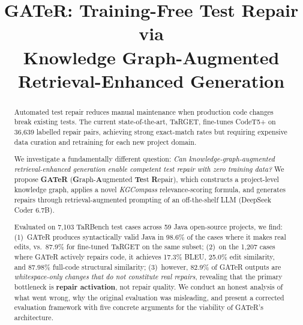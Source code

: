 \documentclass[conference,10pt]{IEEEtran}
\begin{document}
\title{GATeR: Training-Free Test Repair via\\Knowledge Graph-Augmented Retrieval-Enhanced Generation}

\author{
}

\maketitle

\begin{abstract}
Automated test repair reduces manual maintenance when production code
changes break existing tests.  The current state-of-the-art,
TaRGET, fine-tunes CodeT5+ on 36{,}639 labelled repair pairs,
achieving strong exact-match rates but requiring expensive data
curation and retraining for each new project domain.

We investigate a fundamentally different question: \emph{Can
knowledge-graph-augmented retrieval-enhanced generation enable competent
test repair with zero training data?}
We propose \textbf{GATeR}
(\textbf{G}raph-\textbf{A}ugmented \textbf{Te}st \textbf{R}epair),
which constructs a project-level knowledge graph, applies a novel
\emph{KGCompass} relevance-scoring formula, and generates repairs
through retrieval-augmented prompting of an off-the-shelf LLM (DeepSeek
Coder 6.7B).

Evaluated on 7{,}103 TaRBench test cases across 59 Java open-source
projects, we find: (1)~GATeR produces syntactically valid Java in 98.6\%
of the cases where it makes real edits, vs.\ 87.9\% for fine-tuned
TaRGET on the same subset; (2)~on the 1{,}207 cases where GATeR
actively repairs code, it achieves 17.3\% BLEU, 25.0\% edit similarity,
and 87.98\% full-code structural similarity; (3)~however, 82.9\% of
GATeR outputs are \emph{whitespace-only changes that do not constitute
real repairs}, revealing that the primary bottleneck is
\textbf{repair activation}, not repair quality.  We conduct an honest
analysis of what went wrong, why the original evaluation was misleading,
and present a corrected evaluation framework with five concrete
arguments for the viability of GATeR's architecture.

\end{abstract}
\end{document}
